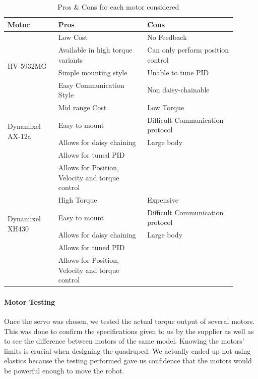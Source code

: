             \begin{table} [H]
                \centering
                    \begin{tabular}{|p{0.2\linewidth}|p{0.35\linewidth}|p{0.35\linewidth}|}
                        \hline
                        Motor  & Pros & Cons \\
                        \hline
                        \multirow{4}{*}{HV-5932MG}& Low Cost  & No Feedback\\
                            & Available in high torque variants & Can only perform position control\\
                            & Simple mounting style & Unable to tune PID\\
                            & Easy Communication Style & Non daisy-chainable \\
                            \hline
                        \multirow{4}{*}{Dynamixel AX-12a}  & Mid range  Cost   &  Low Torque\\
                            & Easy to mount & Difficult Communication protocol \\
                            & Allows for daisy chaining & Large body\\
                            & Allows for tuned PID & \\
                            & Allows for Position, Velocity and torque control& \\
                            \hline
                        \multirow{4}{*}{Dynamixel XH430}  & High Torque  & Expensive\\
                            & Easy to mount & Difficult Communication protocol \\
                            & Allows for daisy chaining & Large body \\
                            & Allows for tuned PID & \\
                            & Allows for Position, Velocity and torque control& \\
                        \hline
                    \end{tabular}
                    \caption{Pros \& Cons for each motor considered}
                    \label{tab:MotorComparison}
                \end{table}
            \paragraph{Motor Testing} \label{par:MotorTesting}
                Once the servo was chosen, we tested the actual torque output of several motors. This was done to confirm the specifications given to us by the supplier as well as to see the difference between motors of the same model. Knowing the motors' limits is crucial when designing the quadruped. We actually ended up not using elastics because the testing performed gave us confidence that the motors would be powerful enough to move the robot.
                
